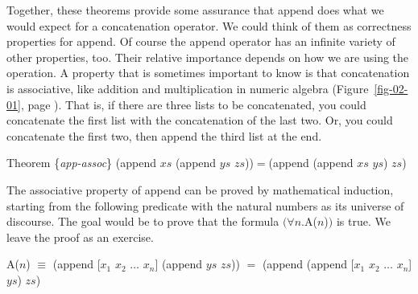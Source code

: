 Together, these theorems provide some assurance that \textsf{append} does what we
would expect for a concatenation operator.
We could think of them as
correctness properties
for \textsf{append}.
Of course the \textsf{append} operator has
an infinite variety of other properties, too.
Their relative importance depends on how we are using the operation.
A property that is sometimes important to know is that concatenation is associative,
like addition and multiplication in numeric algebra
(Figure~\ref{fig-02-01}, page \pageref{fig-02-01}).
That is, if there are three lists to be concatenated,
you could concatenate the first list with the concatenation of the last two.
Or, you could concatenate the first two, then append the third list at the end.
\begin{samepage}
\label{app-assoc}
\begin{center}
Theorem \{\emph{app-assoc}\} \textsf{(append $xs$ (append $ys$ $zs$))}$=$\textsf{(append (append $xs$ $ys$) $zs$)}
\end{center}
\end{samepage}

The associative property of append can be proved by mathematical induction,
starting from the following predicate with the natural numbers as its
universe of discourse.
The goal would be to prove that the formula $(\forall n.$A($n$)$)$ is true.
We leave the proof as an exercise.
\begin{samepage}
\begin{center}
A($n$) $\equiv$ \textsf{(append [$x_1$ $x_2$ $\dots$ $x_n$] (append $ys$ $zs$))} $=$ \textsf{(append (append [$x_1$ $x_2$ $\dots$ $x_n$] $ys$) $zs$)}
\end{center}
\end{samepage}

